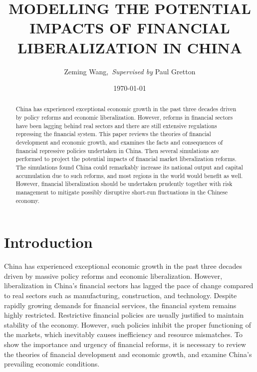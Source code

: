 \documentclass[AER]{AEA}
\begin{document}
\title{MODELLING THE POTENTIAL IMPACTS OF FINANCIAL LIBERALIZATION IN CHINA}
\author{Zeming Wang,\ \textit{Supervised by} Paul Gretton}
\date{\today}

\begin{abstract}
\noindent
China has experienced exceptional economic growth in the past three decades 
driven by policy reforms and economic liberalization. 
However, reforms in financial sectors have been lagging behind real sectors 
and there are still extensive regulations repressing the financial system.
This paper reviews the theories of financial development and economic growth, 
and examines the facts and consequences of financial repressive policies 
undertaken in China. 
Then several simulations are performed to project the potential impacts of 
financial market liberalization reforms. 
The simulations found China could remarkably increase its national output 
and capital accumulation due to such reforms, and most regions in the 
world would benefit as well. 
However, financial liberalization should be undertaken prudently together 
with risk management to mitigate possibly disruptive short-run fluctuations 
in the Chinese economy.
\end{abstract}


\maketitle

\section{Introduction}

China has experienced exceptional economic growth in the past three decades 
driven by massive policy reforms and economic liberalization.
However, liberalization in China's financial sectors has lagged 
the pace of change compared to real sectors such as manufacturing, 
construction, and technology. 
Despite rapidly growing demands for financial 
services, the financial system remains highly restricted. 
Restrictive financial policies are usually justified to maintain  
stability of the economy. 
However, such policies inhibit the proper functioning of the markets,  
which inevitably causes inefficiency and resource mismatches. 
To show the importance and urgency of financial reforms, it is necessary 
to review the theories of financial development and economic growth, 
and examine China's prevailing economic conditions. 
\end{document}
